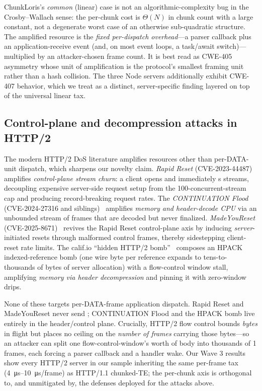 ChunkLoris's \emph{common} (linear) case is not an algorithmic-complexity
bug in the Crosby--Wallach sense: the per-chunk cost is $\Theta(N)$ in
chunk count with a large constant, not a degenerate worst case of an
otherwise sub-quadratic structure. The amplified resource is the
\emph{fixed per-dispatch overhead}---a parser callback plus an
application-receive event (and, on most event loops, a task/await
switch)---multiplied by an attacker-chosen frame count. It is best read
as CWE-405 asymmetry whose unit of amplification is the protocol's
smallest framing unit rather than a hash collision. The three Node
servers additionally exhibit CWE-407 behavior, which we treat as a
distinct, server-specific finding layered on top of the universal linear
tax.

\subsection{Control-plane and decompression attacks in HTTP/2}
\label{sec:rel-h2}

The modern HTTP/2 DoS literature amplifies resources other than
per-DATA-unit dispatch, which sharpens our novelty claim. \emph{Rapid
Reset} (CVE-2023-44487)~\cite{rapidreset2023,rapidreset_cloudflare}
amplifies \emph{control-plane stream churn}: a client opens and
immediately s streams, decoupling expensive
server-side request setup from the 100-concurrent-stream cap and
producing record-breaking request rates. The \emph{CONTINUATION Flood}
(CVE-2024-27316 and siblings)~\cite{continuation2024,continuation_nowotarski}
amplifies \emph{memory and header-decode CPU} via an unbounded stream of
 frames that are decoded but never finalized.
\emph{MadeYouReset} (CVE-2025-8671)~\cite{madeyoureset,madeyoureset_cert}
revives the Rapid Reset control-plane axis by inducing
\emph{server}-initiated resets through malformed control frames, thereby
sidestepping client-reset rate limits. The calif.io ``hidden HTTP/2
bomb''~\cite{calif_http2bomb} composes an HPACK indexed-reference bomb
(one wire byte per reference expands to tens-to-thousands of bytes of
server allocation) with a flow-control window stall, amplifying
\emph{memory via header decompression} and pinning it with zero-window
 drips.

None of these targets per-DATA-frame application dispatch. Rapid Reset and
MadeYouReset never send ; CONTINUATION Flood and the HPACK bomb
live entirely in the header/control plane. Crucially, HTTP/2 flow control
bounds \emph{bytes} in flight but places no ceiling on the \emph{number of
frames} carrying those bytes---so an attacker can split one
flow-control-window's worth of body into thousands of \SI{1}{\byte}
 frames, each forcing a parser callback and a handler wake. Our
Wave 3 results show every HTTP/2 server in our sample inheriting the same
per-frame tax (\SIrange{4}{10}{\micro\second}/frame) as HTTP/1.1
chunked-TE; the per-chunk axis is orthogonal to, and unmitigated by, the
defenses deployed for the attacks above.

